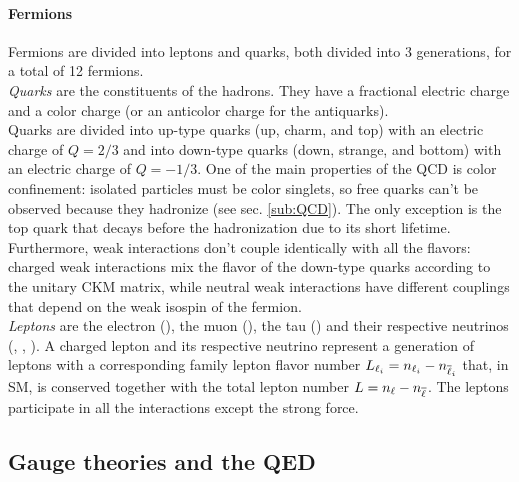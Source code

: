 \paragraph*{Fermions}
Fermions are divided into leptons and quarks, both divided into 3 generations, for a total of 12 fermions.\\
\emph{Quarks} are the constituents of the hadrons. They have a fractional electric charge and a color charge (or an anticolor charge for the antiquarks).\\
Quarks are divided into up-type quarks (up, charm, and top) with an electric charge of $Q=2/3$ and into down-type quarks (down, strange, and bottom) with an electric charge of $Q=-1/3$.
One of the main properties of the QCD is color confinement: isolated particles must be color singlets, so free quarks can't be observed because they hadronize (see sec. \ref{sub:QCD}).
The only exception is the top quark that decays before the hadronization due to its short lifetime.\\
Furthermore, weak interactions don't couple identically with all the flavors: charged weak interactions mix the flavor of the down-type quarks according to the unitary CKM matrix, while neutral weak interactions have different couplings that depend on the weak isospin of the fermion.\\
\emph{Leptons} are the electron (\Pe), the muon (\PGm), the tau (\PGt) and their respective neutrinos (\PGne, \PGnGm, \PGnGt).
A charged lepton and its respective neutrino represent a generation of leptons with a corresponding family lepton flavor number $L_{\ell_i}=n_{\ell_i}-n_{{\overline{\ell}}_i}$ that, in SM, is conserved together with the total lepton number $L=n_\ell-n_{\overline{\ell}}$.
The leptons participate in all the interactions except the strong force.\\


\subsection{Gauge theories and the QED}\label{sub:gauge_qed}
